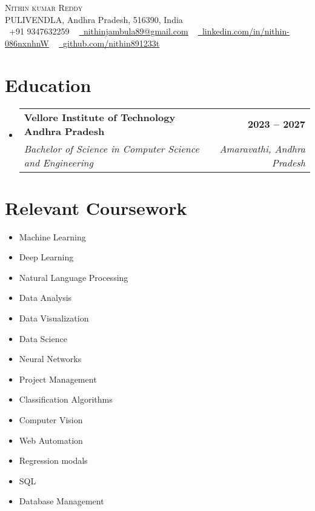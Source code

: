 \documentclass[letterpaper,11pt]{article}
\makeatletter
\newcommand{\resumeSubheading}[4]{
  \vspace{-2pt}\item
    \begin{tabular*}{1.0\textwidth}[t]{l@{\extracolsep{\fill}}r}
      \textbf{#1} & \textbf{\small #2} \\
      \textit{\small#3} & \textit{\small #4} \\
    \end{tabular*}\vspace{-7pt}
}
\newcommand{\resumeSubHeadingListStart}{\begin{itemize}[leftmargin=0.0in, label={}]}
\newcommand{\resumeSubHeadingListEnd}{\end{itemize}}
\makeatother
\begin{document}
\begin{center}
    {\Huge \scshape Nithin kumar Reddy} \\ \vspace{1pt}
    PULIVENDLA, Andhra Pradesh, 516390, India \\ \vspace{1pt}
    \small \raisebox{-0.1\height}\faPhone\ +91 9347632259 ~ \href{mailto:nithinjambula89@gmail.com}{\raisebox{-0.2\height}\faEnvelope\  \underline{nithinjambula89@gmail.com}} ~ 
    \href{https://www.linkedin.com/in/nithin-086nxnhnW}{\raisebox{-0.2\height}\faLinkedin\ \underline{linkedin.com/in/nithin-086nxnhnW}}  ~
    \href{https://github.com/nithin891233t}{\raisebox{-0.2\height}\faGithub\ \underline{github.com/nithin891233t}}
    \vspace{-8pt}
\end{center}

\section{Education}
  \resumeSubHeadingListStart
    \resumeSubheading
      {Vellore Institute of Technology Andhra Pradesh}{2023 -- 2027}
      {Bachelor of Science in Computer Science and Engineering}{Amaravathi, Andhra Pradesh}
  \resumeSubHeadingListEnd



\section{Relevant Coursework}
    \begin{multicols}{4}
        \begin{itemize}[itemsep=-5pt, parsep=3pt]
            \item\small Machine Learning
            \item\small Deep Learning
            \item\small Natural Language Processing
            \item\small Data Analysis
            \item\small Data Visualization
            \item\small Data Science
            \item\small Neural Networks
            \item\small Project Management
            \item\small Classification Algorithms
            \item\small Computer Vision
            \item\small Web Automation
            \item\small Regression modals
            \item\small SQL
            \item\small Database Management
        \end{itemize}
    \end{multicols}
    \vspace*{2.0\multicolsep}
\end{document}
